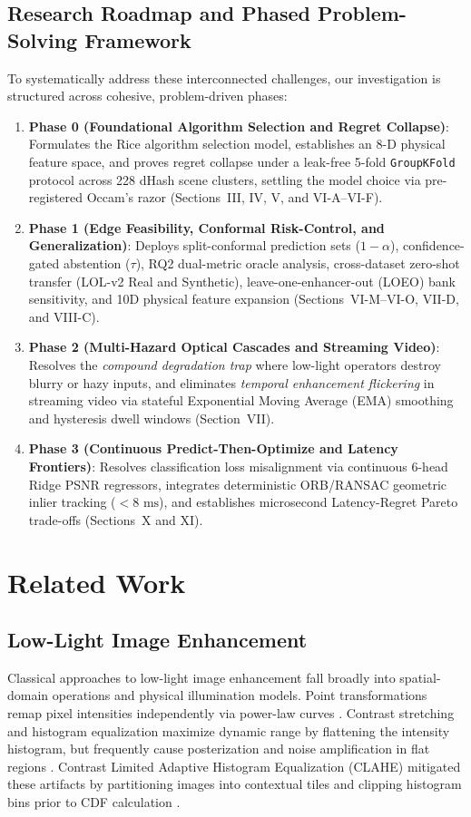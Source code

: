 \documentclass[journal]{IEEEtran}
\begin{document}
\subsection{Research Roadmap and Phased Problem-Solving Framework}
To systematically address these interconnected challenges, our investigation is structured across cohesive, problem-driven phases:
\begin{enumerate}
    \item \textbf{Phase 0 (Foundational Algorithm Selection and Regret Collapse)}: Formulates the Rice algorithm selection model, establishes an 8-D physical feature space, and proves regret collapse under a leak-free 5-fold \texttt{GroupKFold} protocol across 228 dHash scene clusters, settling the model choice via pre-registered Occam's razor (Sections~III, IV, V, and VI-A--VI-F).
    \item \textbf{Phase 1 (Edge Feasibility, Conformal Risk-Control, and Generalization)}: Deploys split-conformal prediction sets ($1-\alpha$), confidence-gated abstention ($\tau$), RQ2 dual-metric oracle analysis, cross-dataset zero-shot transfer (LOL-v2 Real and Synthetic), leave-one-enhancer-out (LOEO) bank sensitivity, and 10D physical feature expansion (Sections~VI-M--VI-O, VII-D, and VIII-C).
    \item \textbf{Phase 2 (Multi-Hazard Optical Cascades and Streaming Video)}: Resolves the \textit{compound degradation trap} where low-light operators destroy blurry or hazy inputs, and eliminates \textit{temporal enhancement flickering} in streaming video via stateful Exponential Moving Average (EMA) smoothing and hysteresis dwell windows (Section~VII).
    \item \textbf{Phase 3 (Continuous Predict-Then-Optimize and Latency Frontiers)}: Resolves classification loss misalignment via continuous 6-head Ridge PSNR regressors, integrates deterministic ORB/RANSAC geometric inlier tracking ($<8\text{ ms}$), and establishes microsecond Latency-Regret Pareto trade-offs (Sections~X and XI).
\end{enumerate}

\section{Related Work}

\subsection{Low-Light Image Enhancement}
Classical approaches to low-light image enhancement fall broadly into spatial-domain operations and physical illumination models. Point transformations remap pixel intensities independently via power-law curves \cite{bradski2000opencv}. Contrast stretching and histogram equalization maximize dynamic range by flattening the intensity histogram, but frequently cause posterization and noise amplification in flat regions \cite{zuiderveld1994contrast}. Contrast Limited Adaptive Histogram Equalization (CLAHE) mitigated these artifacts by partitioning images into contextual tiles and clipping histogram bins prior to CDF calculation \cite{zuiderveld1994contrast}.
\end{document}
